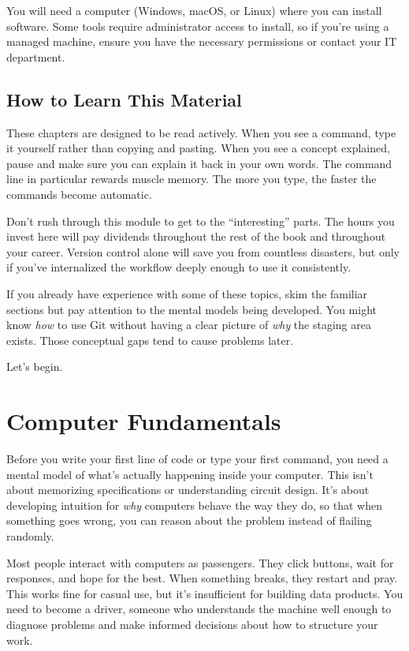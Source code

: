 \documentclass[
  letterpaper,
  DIV=11,
  numbers=noendperiod]{scrreprt}
\begin{document}
You will need a computer (Windows, macOS, or Linux) where you can
install software. Some tools require administrator access to install, so
if you're using a managed machine, ensure you have the necessary
permissions or contact your IT department.

\section*{How to Learn This Material}\label{how-to-learn-this-material}


These chapters are designed to be read actively. When you see a command,
type it yourself rather than copying and pasting. When you see a concept
explained, pause and make sure you can explain it back in your own
words. The command line in particular rewards muscle memory. The more
you type, the faster the commands become automatic.

Don't rush through this module to get to the ``interesting'' parts. The
hours you invest here will pay dividends throughout the rest of the book
and throughout your career. Version control alone will save you from
countless disasters, but only if you've internalized the workflow deeply
enough to use it consistently.

If you already have experience with some of these topics, skim the
familiar sections but pay attention to the mental models being
developed. You might know \emph{how} to use Git without having a clear
picture of \emph{why} the staging area exists. Those conceptual gaps
tend to cause problems later.

Let's begin.

\chapter{Computer Fundamentals}\label{sec-fundamentals}

Before you write your first line of code or type your first command, you
need a mental model of what's actually happening inside your computer.
This isn't about memorizing specifications or understanding circuit
design. It's about developing intuition for \emph{why} computers behave
the way they do, so that when something goes wrong, you can reason about
the problem instead of flailing randomly.

Most people interact with computers as passengers. They click buttons,
wait for responses, and hope for the best. When something breaks, they
restart and pray. This works fine for casual use, but it's insufficient
for building data products. You need to become a driver, someone who
understands the machine well enough to diagnose problems and make
informed decisions about how to structure your work.
\end{document}
